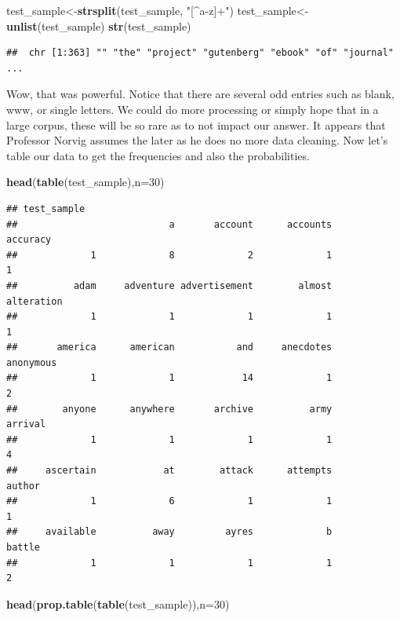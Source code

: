 \documentclass[]{book}
\newenvironment{Shaded}{\begin{snugshade}}{\end{snugshade}}
\newcommand{\KeywordTok}[1]{\textcolor[rgb]{0.13,0.29,0.53}{\textbf{#1}}}
\newcommand{\DataTypeTok}[1]{\textcolor[rgb]{0.13,0.29,0.53}{#1}}
\newcommand{\DecValTok}[1]{\textcolor[rgb]{0.00,0.00,0.81}{#1}}
\newcommand{\StringTok}[1]{\textcolor[rgb]{0.31,0.60,0.02}{#1}}
\newcommand{\NormalTok}[1]{#1}
\theoremstyle{definition}
\theoremstyle{definition}
\theoremstyle{definition}
\theoremstyle{remark}
\begin{document}
\begin{Shaded}
\begin{Highlighting}[]
\NormalTok{test_sample<-}\KeywordTok{strsplit}\NormalTok{(test_sample, }\StringTok{"[^a-z]+"}\NormalTok{)}
\NormalTok{test_sample<-}\KeywordTok{unlist}\NormalTok{(test_sample)}
\KeywordTok{str}\NormalTok{(test_sample)}
\end{Highlighting}
\end{Shaded}

\begin{verbatim}
##  chr [1:363] "" "the" "project" "gutenberg" "ebook" "of" "journal" ...
\end{verbatim}

Wow, that was powerful. Notice that there are several odd entries such
as blank, www, or single letters. We could do more processing or simply
hope that in a large corpus, these will be so rare as to not impact our
answer. It appears that Professor Norvig assumes the later as he does no
more data cleaning. Now let's table our data to get the frequencies and
also the probabilities.

\begin{Shaded}
\begin{Highlighting}[]
\KeywordTok{head}\NormalTok{(}\KeywordTok{table}\NormalTok{(test_sample),}\DataTypeTok{n=}\DecValTok{30}\NormalTok{)}
\end{Highlighting}
\end{Shaded}

\begin{verbatim}
## test_sample
##                           a       account      accounts      accuracy 
##             1             8             2             1             1 
##          adam     adventure advertisement        almost    alteration 
##             1             1             1             1             1 
##       america      american           and     anecdotes     anonymous 
##             1             1            14             1             2 
##        anyone      anywhere       archive          army       arrival 
##             1             1             1             1             4 
##     ascertain            at        attack      attempts        author 
##             1             6             1             1             1 
##     available          away         ayres             b        battle 
##             1             1             1             1             2
\end{verbatim}

\begin{Shaded}
\begin{Highlighting}[]
\KeywordTok{head}\NormalTok{(}\KeywordTok{prop.table}\NormalTok{(}\KeywordTok{table}\NormalTok{(test_sample)),}\DataTypeTok{n=}\DecValTok{30}\NormalTok{)}
\end{Highlighting}
\end{Shaded}
\end{document}
